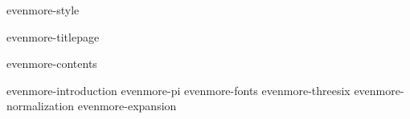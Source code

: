 \environment evenmore-style

\dontcomplain

\startdocument

    \component evenmore-titlepage

    \startfrontmatter
        \component evenmore-contents
    \stopfrontmatter

    \startbodymatter
        \component evenmore-introduction
        \component evenmore-pi
        \component evenmore-fonts
        \component evenmore-threesix
        \component evenmore-normalization
        \component evenmore-expansion
    \stopbodymatter

\stopdocument
